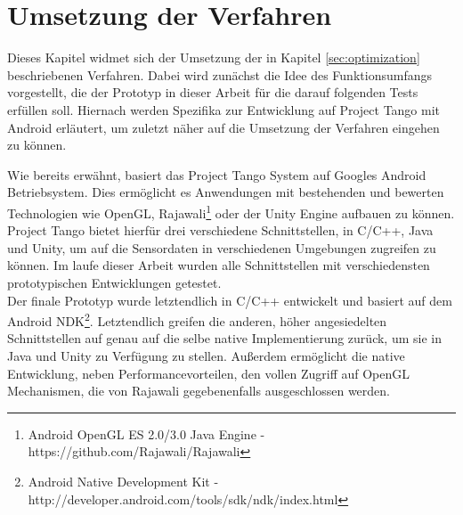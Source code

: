 \chapter{Umsetzung der Verfahren}

Dieses Kapitel widmet sich der Umsetzung der in Kapitel \ref{sec:optimization} beschriebenen Verfahren. Dabei wird zunächst die Idee des Funktionsumfangs vorgestellt, die der Prototyp in dieser Arbeit für die darauf folgenden Tests erfüllen soll. Hiernach werden Spezifika zur Entwicklung auf Project Tango mit Android erläutert, um zuletzt näher auf die Umsetzung der Verfahren eingehen zu können.



Wie bereits erwähnt, basiert das Project Tango System auf Googles Android Betriebsystem. Dies ermöglicht es Anwendungen mit bestehenden und bewerten Technologien wie OpenGL, Rajawali\footnote{Android OpenGL ES 2.0/3.0 Java Engine - https://github.com/Rajawali/Rajawali} oder der Unity Engine aufbauen zu können. Project Tango bietet hierfür drei verschiedene Schnittstellen, in C/C++, Java und Unity, um auf die Sensordaten in verschiedenen Umgebungen zugreifen zu können. Im laufe dieser Arbeit wurden alle Schnittstellen mit verschiedensten prototypischen Entwicklungen getestet. \\

Der finale Prototyp wurde letztendlich in C/C++ entwickelt und basiert auf dem Android NDK\footnote{Android Native Development Kit - http://developer.android.com/tools/sdk/ndk/index.html}. Letztendlich greifen die anderen, höher angesiedelten Schnittstellen auf genau auf die selbe native Implementierung zurück, um sie in Java und Unity zu Verfügung zu stellen. Außerdem ermöglicht die native Entwicklung, neben Performancevorteilen, den vollen Zugriff auf OpenGL Mechanismen, die von Rajawali gegebenenfalls ausgeschlossen werden.






